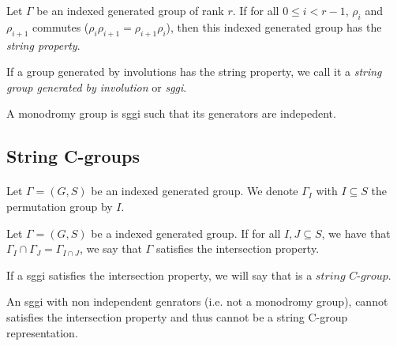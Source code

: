 \begin{definition}
  Let $\Gamma$ be an indexed generated group of rank $r$. If for all $0 \le i < r-1$, $\rho_i$ and $\rho_{i+1}$ commutes ($\rho_i \rho_{i+1} = \rho_{i+1}\rho_i$), then this indexed generated group has the \textit{string property}.
\end{definition}

\begin{definition}
  If a group generated by involutions has the string property, we call it a \textit{string group generated by involution} or \textit{sggi}.
\end{definition}

\begin{definition}
  A monodromy group is sggi such that its generators are indepedent.
\end{definition}

\subsection{String C-groups}

\paragraph{}
Let $\Gamma = (G,S)$ be an indexed generated group. We denote $\Gamma_I$ with $I \subseteq S$ the permutation group by $I$.

\begin{definition}
  Let $\Gamma = (G,S)$ be a indexed generated group. If for all $I, J \subseteq S$, we have that $\Gamma_I \cap \Gamma_J = \Gamma_{I \cap J}$, we say that $\Gamma$ satisfies the intersection property.
\end{definition}

\begin{definition}
  If a sggi satisfies the intersection property, we will say that is a $\textit{string C-group}$.
\end{definition}

\begin{property}
  \label{not-monodromy-intersection}
  An sggi with non independent genrators (i.e. not a monodromy group), cannot satisfies the intersection property and thus cannot be a string C-group representation.
\end{property}
